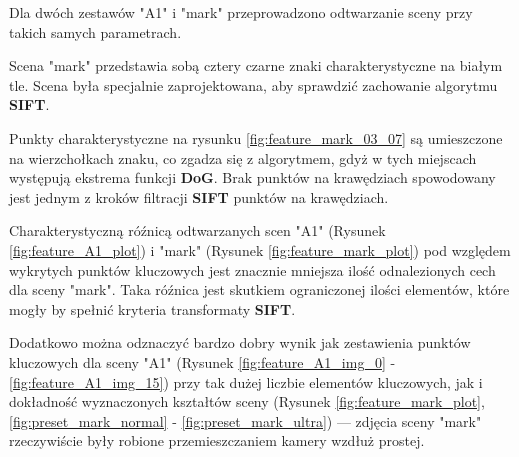    Dla dwóch zestawów "A1" i "mark" przeprowadzono odtwarzanie sceny przy takich samych parametrach.

   Scena "mark" przedstawia sobą cztery czarne znaki charakterystyczne na białym tle.
   Scena była specjalnie zaprojektowana, aby sprawdzić zachowanie algorytmu \textbf{SIFT}.

   Punkty charakterystyczne na rysunku \ref{fig:feature_mark_03_07} są umieszczone na wierzchołkach znaku, co zgadza się z algorytmem, gdyż w tych miejscach występują ekstrema funkcji \textbf{DoG}.
   Brak punktów na krawędziach spowodowany jest jednym z kroków filtracji \textbf{SIFT} punktów na krawędziach.

   Charakterystyczną róźnicą odtwarzanych scen "A1" (Rysunek \ref{fig:feature_A1_plot}) i "mark" (Rysunek \ref{fig:feature_mark_plot}) pod względem wykrytych punktów kluczowych jest znacznie mniejsza ilość odnalezionych cech dla sceny "mark".
   Taka róźnica jest skutkiem ograniczonej ilości elementów, które mogły by spełnić kryteria transformaty \textbf{SIFT}.

   Dodatkowo można odznaczyć bardzo dobry wynik jak zestawienia punktów kluczowych dla sceny "A1" (Rysunek \ref{fig:feature_A1_img_0} - \ref{fig:feature_A1_img_15}) przy tak dużej liczbie elementów kluczowych, jak i dokładność wyznaczonych kształtów sceny (Rysunek \ref{fig:feature_mark_plot}, \ref{fig:preset_mark_normal} - \ref{fig:preset_mark_ultra}) --- zdjęcia sceny "mark" rzeczywiście były robione przemieszczaniem kamery wzdłuż prostej.

